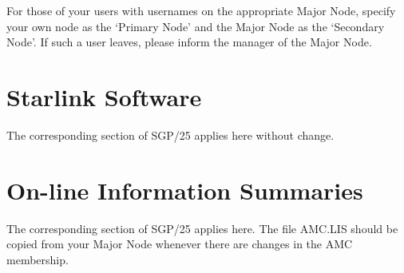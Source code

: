 For those of your users with usernames on the appropriate Major Node, specify
your own node as the `Primary Node' and the Major Node as the `Secondary Node'.
If such a user leaves, please inform the manager of the Major Node.  

\section {Starlink Software}

The corresponding section of SGP/25 applies here without change.

\section {On-line Information Summaries}

The corresponding section of SGP/25 applies here.
The file AMC.LIS should be copied from your Major Node whenever there are
changes in the AMC membership.

